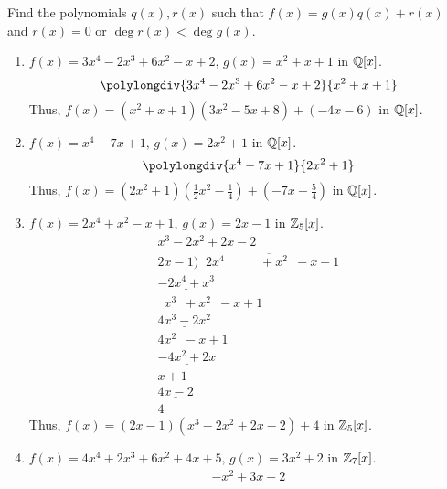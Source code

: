 \documentclass[../hw4]{subfiles}
\begin{document}
\begin{problem}
Find the polynomials $q(x),r(x)$ such that  $f(x)=g(x)q(x)+r(x)$ and  $r(x)=0$ or  $\deg{r(x)}<\deg{g(x)}$.
\begin{enumerate}[label=\alph*)]
	\item $f(x)=3x^4-2x^3+6x^2-x+2,\, g(x)=x^2 + x + 1$ in $\mathbb{Q}[x]$.
	      \[\polylongdiv{3x^4-2x^3+6x^2-x+2}{x^2 + x + 1}\]
	      Thus, $f(x)=(x^2 + x + 1)(3x^2-5x+8)+(-4x-6)$ in $\mathbb{Q}[x]$.
	\item  $f(x)=x^4-7x+1,\, g(x)=2x^2+1$ in $\mathbb{Q}[x]$.
	      \[\polylongdiv{x^4-7x+1}{2x^2 + 1}\]
	      Thus, $f(x)=(2x^2+1)\left( \frac{1}{2}x^2-\frac{1}{4} \right) + \left( -7x + \frac{5}{4} \right)$ in $\mathbb{Q}[x]$.
	\item $f(x)=2x^4+x^2-x+1,\, g(x)=2x-1$ in $\mathbb{Z}_5[x]$.
	      \[
		      \begin{array}{r}
			      x^3-2x^2+2x-2                                                                              \\
			      2x-1 \big) \overline {\phantom{..} 2x^4\phantom{+0x^3} \phantom{0}+x^2  \phantom{0}-x  +1} \\
			      \underline{-2x^4  +x^3}\phantom{+0x^2+0x+00}                                               \\
			      \phantom{0}x^3\phantom{0}+x^2\phantom{0}-x+1                                               \\
			      \underline{4x^3 - 2x^2} \phantom{+0x+00}                                                   \\
			      4x^2\phantom{0}-x+1                                                                        \\
			      \underline{-4x^2+2x}\phantom{+00}                                                          \\
			      x+1                                                                                        \\
			      \underline{4x-2}                                                                           \\
			      4
		      \end{array}
	      \]
	      Thus, $f(x)=(2x-1)(x^3-2x^2+2x-2)+4$ in $\mathbb{Z}_5[x]$.
	\item  $f(x)=4x^4+2x^3+6x^2+4x+5,\, g(x)=3x^2 + 2$ in $\mathbb{Z}_7[x]$.
	      \[
		      \begin{array}{r}
			      -x^2+3x-2                                                   \\

\end{array}\]
\end{enumerate}
\end{problem}
\end{document}
